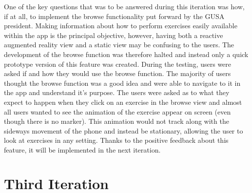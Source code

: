 \documentclass{l4proj}
\begin{document}
One of the key questions that was to be answered during this iteration was how, if at all, to implement the browse functionality put forward by the GUSA president. Making information about how to perform exercises easily available within the app is the principal objective, however, having both a reactive augmented reality view and a static view may be confusing to the users. The development of the browse function was therefore halted and instead only a quick prototype version of this feature was created. During the testing, users were asked if and how they would use the browse function. The majority of users thought the browse function was a good idea and were able to navigate to it in the app and understand it's purpose. The users were asked as to what they expect to happen when they click on an exercise in the browse view and almost all users wanted to see the animation of the exercise appear on screen (even though there is no marker). This animation would not track along with the sideways movement of the phone and instead be stationary, allowing the user to look at exercises in any setting. Thanks to the positive feedback about this feature, it will be implemented in the next iteration.

\section{Third Iteration}
\end{document}

